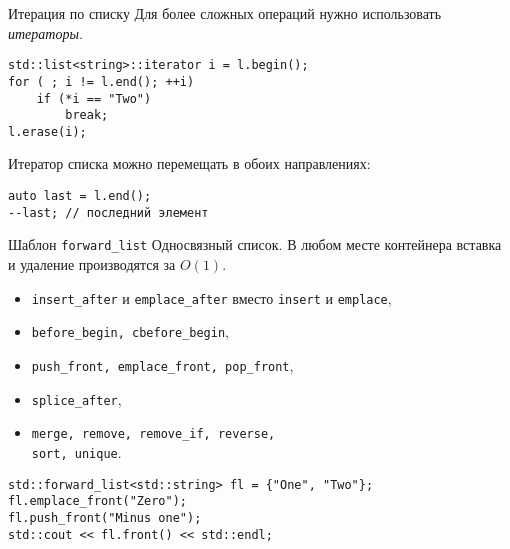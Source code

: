 \documentclass{beamer}
\begin{document}
\begin{frame}[fragile]{Итерация по списку}
Для более сложных операций нужно использовать \emph{итераторы}.
\begin{lstlisting}
std::list<string>::iterator i = l.begin();
for ( ; i != l.end(); ++i)
    if (*i == "Two")
        break;
l.erase(i);
\end{lstlisting}

Итератор списка можно перемещать в обоих направлениях:
\begin{lstlisting}    
auto last = l.end();
--last; // последний элемент
\end{lstlisting}
\end{frame}

\begin{frame}[fragile]{Шаблон \texttt{forward\_list}}
Односвязный список. В любом месте контейнера 
вставка и удаление производятся за $O(1)$.
\begin{itemize}
    \item \texttt{insert\_after} и \texttt{emplace\_after} вместо \texttt{insert} и \texttt{emplace},
    \item  \texttt{before\_begin, cbefore\_begin},
    \item {\tt push\_front, emplace\_front, pop\_front},
    \item {\tt splice\_after},
    \item {\tt merge, remove, remove\_if, reverse,\\ sort, unique}.
\end{itemize}

\begin{lstlisting}
std::forward_list<std::string> fl = {"One", "Two"};
fl.emplace_front("Zero");
fl.push_front("Minus one");
std::cout << fl.front() << std::endl;
\end{lstlisting}
\end{frame}
\end{document}
